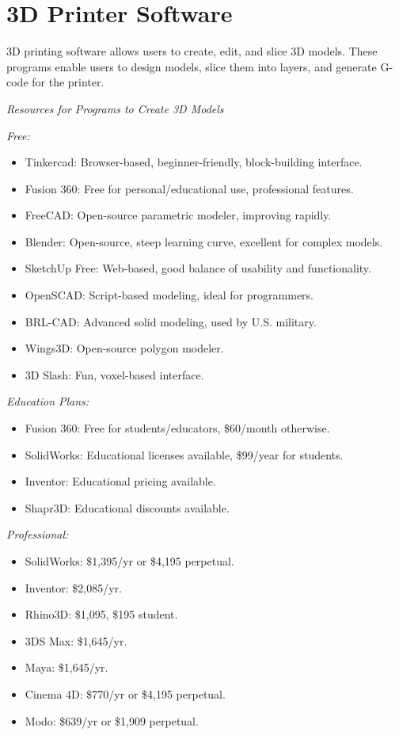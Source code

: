 \section{3D Printer Software}\label{d-printer-materials-program}
3D printing software allows users to create, edit, and slice 3D models. These programs enable users to design models, slice them into layers, and generate G-code for the printer.

\emph{Resources for Programs to Create 3D Models}

\textit{Free:}
\begin{itemize}
    \item Tinkercad: Browser-based, beginner-friendly, block-building interface.
    \item Fusion 360: Free for personal/educational use, professional features.
    \item FreeCAD: Open-source parametric modeler, improving rapidly.
    \item Blender: Open-source, steep learning curve, excellent for complex models.
    \item SketchUp Free: Web-based, good balance of usability and functionality.
    \item OpenSCAD: Script-based modeling, ideal for programmers.
    \item BRL-CAD: Advanced solid modeling, used by U.S. military.
    \item Wings3D: Open-source polygon modeler.
    \item 3D Slash: Fun, voxel-based interface.
\end{itemize}

\textit{Education Plans:}
\begin{itemize}
    \item Fusion 360: Free for students/educators, \$60/month otherwise.
    \item SolidWorks: Educational licenses available, \$99/year for students.
    \item Inventor: Educational pricing available.
    \item Shapr3D: Educational discounts available.
\end{itemize}

\textit{Professional:}
\begin{itemize}
    \item SolidWorks: \$1,395/yr or \$4,195 perpetual.
    \item Inventor: \$2,085/yr.
    \item Rhino3D: \$1,095, \$195 student.
    \item 3DS Max: \$1,645/yr.
    \item Maya: \$1,645/yr.
    \item Cinema 4D: \$770/yr or \$4,195 perpetual.
    \item Modo: \$639/yr or \$1,909 perpetual.
\end{itemize}

